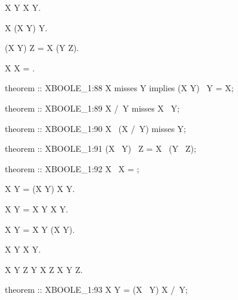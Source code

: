 \begin{paracol}{2}
\begin{theorem}
  X \cap Y \misses X \setminus Y.
\end{theorem}

\begin{theorem}
  X \setminus (X \cap Y) \misses Y.
\end{theorem}

\begin{theorem}
  (X \dotminus Y) \dotminus Z = X \dotminus (Y \dotminus Z).
\end{theorem}

\begin{theorem}
  X \dotminus X = \emptyset.
\end{theorem}

\switchcolumn

\begin{mizar}
theorem :: XBOOLE_1:88
  X misses Y implies (X \/ Y) \ Y = X;

theorem :: XBOOLE_1:89
  X /\ Y misses X \ Y;

theorem :: XBOOLE_1:90
  X \ (X /\ Y) misses Y;

theorem :: XBOOLE_1:91
  (X \+\ Y) \+\ Z = X \+\ (Y \+\ Z);

theorem :: XBOOLE_1:92
  X \+\ X = {};
\end{mizar}

\switchcolumn*\ensurevspace{5cm}

\begin{theorem}
  X \cup Y = (X \dotminus Y) \cup X \cap Y.
\end{theorem}

\begin{theorem}
  X \cup Y = X \dotminus Y \dotminus X \cap Y.
\end{theorem}

\begin{theorem}
  X \cap Y = X \dotminus Y \dotminus (X \cup Y).
\end{theorem}

\begin{theorem}
  X \setminus Y \subset X \dotminus Y.
\end{theorem}

\begin{theorem}
  X \setminus Y \subset Z \land Y \setminus X \subset Z \implies X \dotminus Y \subset Z.
\end{theorem}

\switchcolumn

\begin{mizar}
theorem :: XBOOLE_1:93
  X \/ Y = (X \+\ Y) \/ X /\ Y;


\end{mizar}
\end{paracol}
